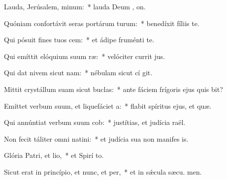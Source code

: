 \item Lauda, Jerúsalem, minum:~* lauda Deum , on.
\item Quóniam confortávit seras portárum turum:~* benedíxit fíliis   te.
\item Qui pósuit fines tuos cem:~* et ádipe fruménti  te.
\item Qui emíttit elóquium suum ræ:~* velóciter currit  jus.
\item Qui dat nivem sicut nam:~* nébulam sicut cí git.
\item Mittit crystállum suam sicut buclas:~* ante fáciem frígoris ejus quis bit?
\item Emíttet verbum suum, et liquefáciet a:~* flabit spíritus ejus, et  quæ.
\item Qui annúntiat verbum suum cob:~* justítias, et judícia  raël.
\item Non fecit táliter omni natini:~* et judícia sua non manifes is.
\item Glória Patri, et lio,~* et Spirí to.
\item Sicut erat in princípio, et nunc, et per,~* et in sǽcula sæcu. men.

